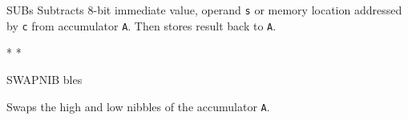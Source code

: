 \begin{basedescript}{
	\desclabelstyle{\multilinelabel}
	\desclabelwidth{3cm}}
\begin{DetailItem}{SUB}{s}
		Subtracts 8-bit immediate value, operand {\tt s} or memory location addressed by {\tt c} from accumulator {\tt A}. Then stores result back to {\tt A}.

		\begin{DetailEffects}[v]
			\FlagsSUBr
		\end{DetailEffects}

		\begin{DetailEffectsFlags}
			\DetailFlagSF{\DetailFlagResultSign}
			\DetailFlagZF{\DetailFlagResultZero}
			\DetailFlagHF{\DetailFlagResultHalfBorrow*}*
			\DetailFlagPV{\DetailFlagResultOverflow}*
			\DetailFlagCF{\DetailFlagResultBorrow*}
		\end{DetailEffectsFlags}

		\begin{DetailTiming}
		\end{DetailTiming}

	\end{DetailItem}

	\pagebreak


	\begin{DetailItem}{SWAPNIB}{\DetailItemZXN}
		{ bles}
		{\SymSWAPNIB}

		Swaps the high and low nibbles of the accumulator {\tt A}.

		\begin{DetailEffects}
			\FlagsSWAPNIB
		\end{DetailEffects}
						
		\begin{DetailTiming}
			\DetailTime{2}{8}
		\end{DetailTiming}

	\end{DetailItem}



\end{basedescript}
